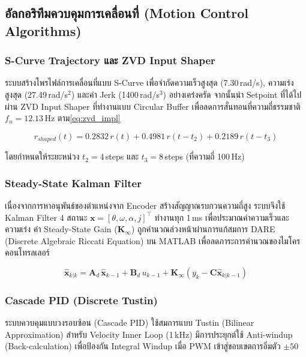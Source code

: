 \subsection{อัลกอริทึมควบคุมการเคลื่อนที่ (Motion Control Algorithms)}
\label{subsec:motion_control}

\subsubsection{S-Curve Trajectory และ ZVD Input Shaper}

ระบบสร้างโพรไฟล์การเคลื่อนที่แบบ S-Curve เพื่อจำกัดความเร็วสูงสุด (7.30\,rad/s), ความเร่งสูงสุด (27.49\,rad/s$^2$) และค่า Jerk (1400\,rad/s$^3$) อย่างเคร่งครัด จากนั้นนำ Setpoint ที่ได้ไปผ่าน ZVD Input Shaper ที่ทำงานแบบ Circular Buffer เพื่อลดการสั่นทอนที่ความถี่ธรรมชาติ $f_n = 12.13$\,Hz ตาม\cref{eq:zvd_impl}

\begin{equation}
  r_{shaped}(t) = 0.2832\,r(t) + 0.4981\,r(t - t_2) + 0.2189\,r(t - t_3)
  \label{eq:zvd_impl}
\end{equation}

โดยกำหนดให้ระยะหน่วง $t_2 = 4$\,steps และ $t_3 = 8$\,steps (ที่ความถี่ 100\,Hz)

\subsubsection{Steady-State Kalman Filter}

เนื่องจากการหาอนุพันธ์ของตำแหน่งจาก Encoder สร้างสัญญาณรบกวนความถี่สูง ระบบจึงใช้ Kalman Filter 4 สถานะ $\mathbf{x} = [\theta, \omega, \alpha, j]^\top$ ทำงานทุก 1\,ms เพื่อประมาณค่าความเร็วและความเร่ง ค่า Steady-State Gain ($\mathbf{K}_\infty$) ถูกคำนวณล่วงหน้าผ่านการแก้สมการ DARE (Discrete Algebraic Riccati Equation) บน MATLAB เพื่อลดภาระการคำนวณของไมโครคอนโทรลเลอร์

\begin{equation}
    \hat{\mathbf{x}}_{k|k} = \mathbf{A}_d\,\hat{\mathbf{x}}_{k-1} + \mathbf{B}_d\,u_{k-1} + \mathbf{K}_\infty(y_k - \mathbf{C}\hat{\mathbf{x}}_{k|k-1})
    \label{eq:kalman_update}
\end{equation}

\subsubsection{Cascade PID (Discrete Tustin)}

ระบบควบคุมแบบวงรอบซ้อน (Cascade PID) ใช้สมการแบบ Tustin (Bilinear Approximation) สำหรับ Velocity Inner Loop (1\,kHz) มีการประยุกต์ใช้ Anti-windup (Back-calculation) เพื่อป้องกัน Integral Windup เมื่อ PWM เข้าสู่ขอบเขตการอิ่มตัว $\pm 50$ 

